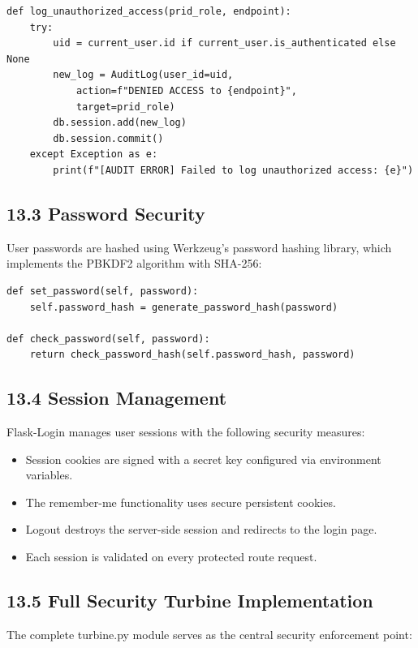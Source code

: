 ﻿\documentclass[12pt]{article}
\begin{document}
\begin{lstlisting}[style=pycode]
def log_unauthorized_access(prid_role, endpoint):
    try:
        uid = current_user.id if current_user.is_authenticated else None
        new_log = AuditLog(user_id=uid,
            action=f"DENIED ACCESS to {endpoint}",
            target=prid_role)
        db.session.add(new_log)
        db.session.commit()
    except Exception as e:
        print(f"[AUDIT ERROR] Failed to log unauthorized access: {e}")
\end{lstlisting}

\subsection*{13.3 Password Security}
User passwords are hashed using Werkzeug's password hashing library, which implements the PBKDF2 algorithm with SHA-256:

\begin{lstlisting}[style=pycode]
def set_password(self, password):
    self.password_hash = generate_password_hash(password)

def check_password(self, password):
    return check_password_hash(self.password_hash, password)
\end{lstlisting}

\subsection*{13.4 Session Management}
Flask-Login manages user sessions with the following security measures:
\begin{itemize}
\item Session cookies are signed with a secret key configured via environment variables.
\item The remember-me functionality uses secure persistent cookies.
\item Logout destroys the server-side session and redirects to the login page.
\item Each session is validated on every protected route request.
\end{itemize}

\subsection*{13.5 Full Security Turbine Implementation}
The complete turbine.py module serves as the central security enforcement point:
\end{document}
